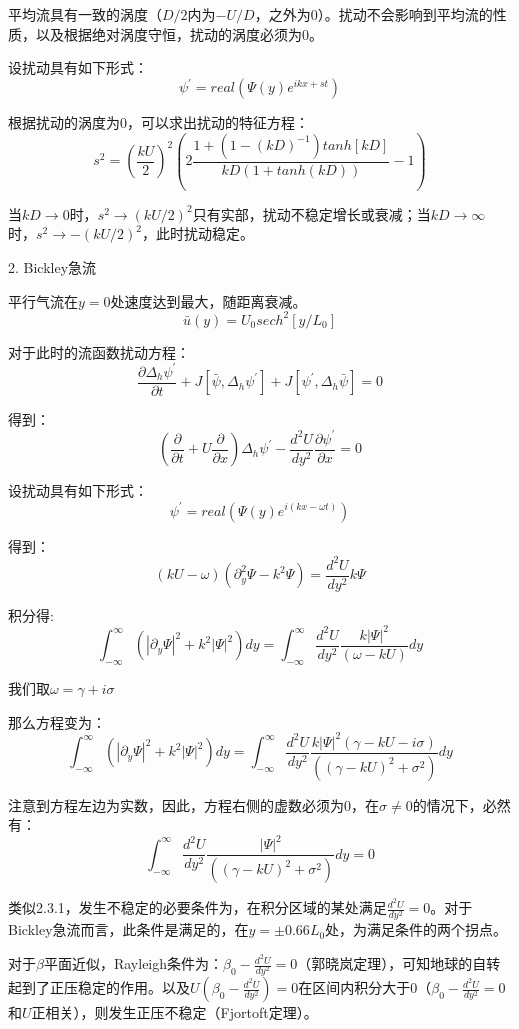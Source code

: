 \documentclass{article}
\begin{document}
平均流具有一致的涡度（$D/2$内为$-U/D$，之外为$0$）。扰动不会影响到平均流的性质，以及根据绝对涡度守恒，扰动的涡度必须为$0$。

设扰动具有如下形式：
$$\psi^{\prime}=real\left(\Psi(y)e^{ikx+st}\right)$$

根据扰动的涡度为$0$，可以求出扰动的特征方程：
$$s^2=\left(\frac{kU}{2}\right)^2\left(2\frac{1+(1-(kD)^{-1})tanh[kD]}{kD(1+tanh(kD))}-1\right)$$

当$kD\rightarrow0$时，$s^2\rightarrow(kU/2)^2$只有实部，扰动不稳定增长或衰减；当$kD \rightarrow \infty$时，$s^2 \rightarrow -(kU/2)^2$，此时扰动稳定。

2. Bickley急流

平行气流在$y=0$处速度达到最大，随距离衰减。
$$\bar{u}(y) = U_0sech^2[y/L_0]$$

对于此时的流函数扰动方程：
$$\frac{\partial\Delta_h\psi^{\prime}}{\partial t} + J[\bar{\psi}, \Delta_h\psi^{\prime}] +J[\psi^{\prime}, \Delta_h\bar{\psi}] = 0$$

得到：
$$(\frac{\partial}{\partial t}+U\frac{\partial}{\partial x})\Delta_h\psi^{\prime}-\frac{d^2U}{dy^2}\frac{\partial\psi^{\prime}}{\partial x} = 0$$

设扰动具有如下形式：
$$\psi^{\prime}=real\left(\Psi(y)e^{i(kx-\omega t)}\right)$$

得到：
$$(kU-\omega)(\partial_y^2\Psi-k^2\Psi)=\frac{d^2U}{dy^2}k\Psi$$

积分得:
$$\int_{-\infty}^{\infty}(|\partial_y\Psi|^2+k^2|\Psi|^2)dy=\int_{-\infty}^{\infty}\frac{d^2U}{dy^2}\frac{k|\Psi|^2}{(\omega-kU)} dy$$

我们取$\omega = \gamma + i\sigma$

那么方程变为：
$$\int_{-\infty}^{\infty}(|\partial_y\Psi|^2+k^2|\Psi|^2)dy=\int_{-\infty}^{\infty}\frac{d^2U}{dy^2}\frac{k|\Psi|^2(\gamma-kU-i\sigma)}{((\gamma-kU)^2+\sigma^2)} dy$$

注意到方程左边为实数，因此，方程右侧的虚数必须为0，在$\sigma\ne0$的情况下，必然有：
$$\int_{-\infty}^{\infty}\frac{d^2U}{dy^2}\frac{|\Psi|^2}{((\gamma-kU)^2+\sigma^2)} dy = 0$$

类似2.3.1，发生不稳定的必要条件为，在积分区域的某处满足$\frac{d^2U}{dy^2}=0$。对于Bickley急流而言，此条件是满足的，在$y= \pm 0.66L_0$处，为满足条件的两个拐点。

对于$\beta$平面近似，Rayleigh条件为：$\beta_0-\frac{d^2U}{dy^2}=0$（郭晓岚定理），可知地球的自转起到了正压稳定的作用。以及$U(\beta_0-\frac{d^2U}{dy^2})=0$在区间内积分大于0（$\beta_0-\frac{d^2U}{dy^2}=0$和$U$正相关），则发生正压不稳定（Fjortoft定理）。
\end{document}
